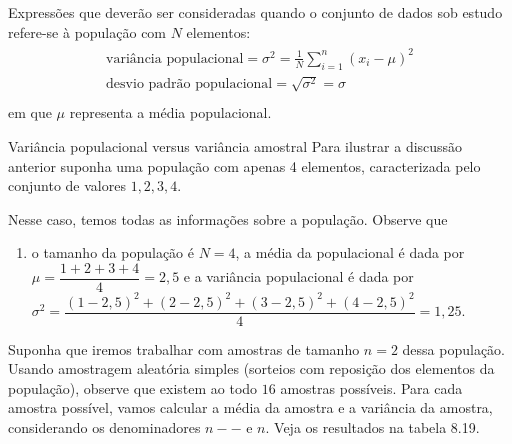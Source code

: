 {{Expressões que deverão ser consideradas quando o conjunto de dados sob estudo refere-se à população com \(N\) elementos:
\begin{align*}\!\begin{aligned}
\text{variância populacional} = \sigma^2=\frac{1}{N}\sum^n_{i=1}(x_i-\mu)^2\\
\text{desvio padrão populacional}=\sqrt{\sigma^2}=\sigma\\
\end{aligned}\end{align*}
em que \(\mu\) representa a média populacional.


\needspace{.25\textheight}
\begin{example}{Variância populacional versus variância amostral}
Para ilustrar a discussão anterior suponha uma população com apenas 4 elementos, caracterizada pelo conjunto de valores ${1,2,3,4}$.

Nesse caso, temos todas as informações sobre a população. Observe que

\begin{enumerate}
\item o tamanho da população é $N=4$,
a média da populacional é dada por $\mu=\dfrac{1+2+3+4}{4}=2,5$ e
a variância populacional é dada por $\sigma^2=\dfrac{(1-2{,}5)^2+(2-2{,}5)^2+(3-2{,}5)^2+(4-2{,}5)^2}{4}=1{,}25$.
\end{enumerate}

Suponha que iremos trabalhar com amostras de tamanho $n=2$ dessa população. Usando amostragem aleatória simples (sorteios com reposição dos elementos da população), observe que existem ao todo $16$ amostras possíveis. Para cada amostra possível, vamos calcular a média da amostra e a variância da amostra, considerando os denominadores $n--$ e $n$. Veja os resultados na tabela 8.19.

\begin{table}[H]
\centering


\end{table}
\end{example}}}
